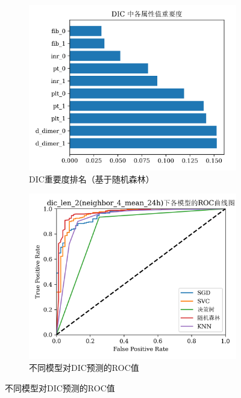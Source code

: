 \documentclass[12pt, a4paper, oneside]{ctexart}
\numberwithin{equation}{section}  %
\begin{document}
\begin{figure}[htbp]
    \hspace{-2cm}
    \begin{subfigure}[b]{0.6\textwidth}
        \includegraphics[scale=0.75]{dic_attributes_rank.png}
        \caption{DIC重要度排名（基于随机森林）}
    \end{subfigure}
    \begin{subfigure}[b]{0.6\textwidth}
        \includegraphics[scale=0.75]{dic_len_2(neighbor_4_mean_24h)_roc_curves.png}
        \caption{不同模型对DIC预测的ROC值}
    \end{subfigure}
    

\end{figure}
\end{document}

